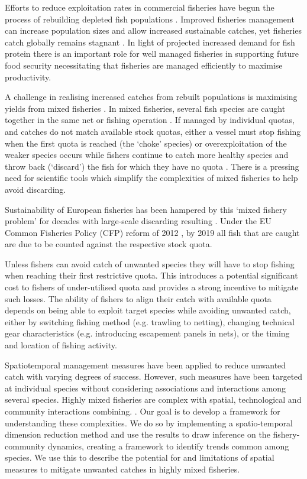 \documentclass{nature}
\begin{document}
\begin{linenumbers}
 Efforts to reduce exploitation rates in commercial fisheries
have begun the process of rebuilding depleted fish populations \cite{Worm2009}.
Improved fisheries management  can increase
population sizes and allow increased sustainable catches, yet fisheries catch
globally remains stagnant . In light of projected
increased demand for fish protein  there is an
important role for well managed fisheries in supporting future food security
\cite{Mcclanahan2015}  
necessitating that fisheries
are managed efficiently to maximise productivity.

A  challenge in realising increased catches
from rebuilt populations is maximising yields from mixed fisheries
\cite{Branch2008, Kuriyama2016, Ulrich2016}. In mixed fisheries,  several fish species are caught
together in the same net or fishing operation . If managed by individual quotas, and catches do not
match available stock quotas, either a vessel must stop fishing when the first
quota is reached (the `choke' species) or overexploitation of the weaker
species occurs while fishers continue to catch more healthy species and throw
back (`discard') the fish for which they have no quota \cite{Batsleer2015}.
There is a pressing need for scientific tools which
simplify the complexities of mixed fisheries to help avoid discarding. 

Sustainability of European fisheries has been hampered by this `mixed fishery
problem' for decades with large-scale discarding resulting \cite{Uhlmann2014}.
 Under the EU Common Fisheries
Policy (CFP) reform of 2012 , by 2019 all fish that are caught are due to be
counted against the respective stock quota. 

    Unless
fishers can avoid catch of unwanted species they will have to stop fishing when
reaching their first restrictive quota. This introduces a potential significant
cost to fishers of under-utilised quota\cite{Ulrich2016} and provides a strong
incentive to mitigate such losses\cite{Condie2013}. The ability of fishers to
align their catch with available quota depends on being able to exploit target
species while avoiding unwanted catch, either by switching fishing
method (e.g.  trawling to netting), changing technical gear characteristics
(e.g.  introducing escapement panels in nets), or the timing and location of
fishing activity\cite{vanPutten2012a}. 

Spatiotemporal management measures  have been applied to reduce unwanted catch with varying
degrees of success\cite{Needle2011, Dunn2014a}.  However, such measures
have  been targeted at individual species without
considering associations and interactions among several species. Highly mixed
fisheries are complex with spatial, technological and community interactions
combining.  .  Our goal is to
develop a framework for understanding these complexities. We do so by
implementing a spatio-temporal dimension reduction method and use the results
to draw inference on the fishery-community dynamics, creating a framework to
identify trends common among species. We use this to describe
the potential for and limitations of spatial
measures to mitigate
unwanted catches in highly mixed fisheries.



\end{linenumbers}
\end{document}

